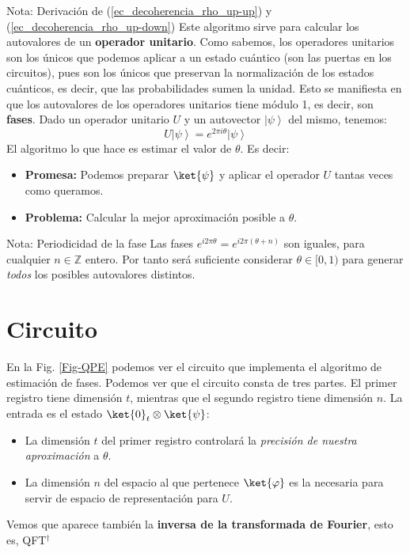 \documentclass[a4paper,11pt]{book} %
\numberwithin{equation}{chapter}
\begin{document}
\begin{mybox_blue}{Nota: Derivación de (\ref{ec_decoherencia_rho_up-up}) y  (\ref{ec_decoherencia_rho_up-down})}
Este algoritmo sirve para calcular los autovalores de un \textbf{operador unitario}. Como sabemos, los operadores unitarios son los únicos que podemos aplicar a un estado cuántico (son las puertas en los circuitos), pues son los únicos que preservan la normalización de los estados cuánticos, es decir, que las probabilidades sumen la unidad. Esto se manifiesta en que los autovalores de los operadores unitarios tiene módulo 1, es decir, son \textbf{fases}. Dado un operador unitario $U$ y un autovector $\left| \psi \right\rangle$ del mismo, tenemos:
$$
U \left| \psi \right\rangle = e^{2 \pi i \theta} \left| \psi \right\rangle
$$
El algoritmo lo que hace es estimar el valor de $\theta$. Es decir:
\begin{itemize}
	\item \textbf{Promesa:} Podemos preparar $\ket{\psi}$ y aplicar el operador $U$ tantas veces como queramos.
	\item \textbf{Problema:} Calcular la mejor aproximación posible a $\theta$.
\end{itemize}

	\begin{mybox_blue}{Nota: Periodicidad de la fase}
	Las fases  $e^{i2\pi \theta}=e^{i2\pi (\theta+n)}$  son iguales, para cualquier $n\in {\mathbb Z}$ entero. Por tanto será suficiente considerar  $\theta \in [0,1)$ para generar \textit{todos} los  posibles autovalores distintos.
	\end{mybox_blue}

\section{Circuito}

En la Fig. \ref{Fig-QPE} podemos ver el circuito que implementa el algoritmo de estimación de fases. Podemos ver que el circuito consta de tres partes. El primer registro tiene dimensión $t$, mientras que el segundo registro tiene dimensión $n$. La entrada es el estado $\ket{0}_t \otimes \ket{\psi}$:
\begin{itemize}
	\item La dimensión $t$ del primer registro controlará la \textit{precisión de nuestra aproximación} a $\theta$. 
	\item La dimensión $n$ del espacio al que pertenece $\ket{\varphi}$  es la necesaria para servir de espacio de representación para $U$.
\end{itemize}
Vemos que aparece también la \textbf{inversa de la transformada de Fourier}, esto es, QFT$^\dagger$


\end{mybox_blue}
\end{document}
